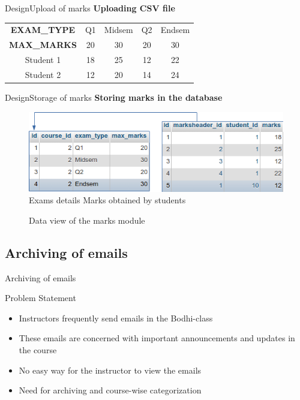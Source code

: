 \documentclass[xcolor=table]{beamer}
\begin{document}
\begin{frame}{Design}{Upload of marks}
	\textbf{Uploading CSV file}
	
	\begin{center}
		\bgroup
		\def\arraystretch{1.5}
		\begin{tabular}{ccccc}
			\hline
			\textbf{EXAM\_TYPE} & Q1 & Midsem & Q2 & Endsem \\
			\textbf{MAX\_MARKS} & 20 & 30 & 20 & 30 \\
			Student 1 & 18 & 25 & 12 & 22 \\ 
			Student 2 & 12 & 20 & 14 & 24 \\ 
			\hline 
		\end{tabular}
		\egroup
	\end{center}
		
\end{frame}


\begin{frame}{Design}{Storage of marks}
	\textbf{Storing marks in the database}
	\begin{figure}
		\centering
		\includegraphics[width=0.8\linewidth]{media/marksdb} \\
		\hspace{1.2cm}Exams details \hspace{1.5cm} Marks obtained by students
		\caption{Data view of the marks module}
		\label{fig:marksdb}
	\end{figure}
	
\end{frame}

\subsection{Archiving of emails}

\begin{frame}{Archiving of emails}
	\begin{block}{Problem Statement}
		\begin{itemize}
			\item Instructors frequently send emails in the Bodhi-class
			\item These emails are concerned with important announcements and updates in the course
			\item No easy way for the instructor to view the emails
			\item Need for archiving and course-wise categorization
		\end{itemize}
	\end{block}
\end{frame}
\end{document}
